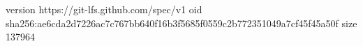 version https://git-lfs.github.com/spec/v1
oid sha256:ae6cda2d7226ac7c767bb640f16b3f5685f0559c2b772351049a7cf45f45a50f
size 137964
